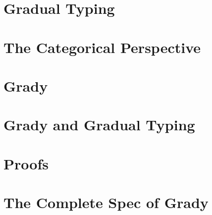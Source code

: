 \documentclass[preprint]{sigplanconf}
\begin{document}
\section{Gradual Typing}
\label{sec:gradual_typing}


\section{The Categorical Perspective}
\label{sec:categorical_perspective}


\section{Grady}
\label{sec:grady}


\section{Grady and Gradual Typing}
\label{sec:grady_and_gradual_typing}



\nocite{*}



\appendix

\section{Proofs}
\label{sec:proofs}



\section{The Complete Spec of Grady}
\label{sec:the_complete_spec_of_grady}
\Gradyall{}
\end{document}
